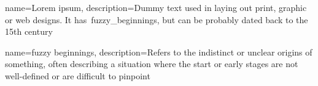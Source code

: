 
\makeglossaries

{
    name=Lorem ipsum,
    description={Dummy text used in laying out print, graphic or web designs.
    It has~\gls{fuzzy_beginnings}, but can be probably dated back to the 15th century}
}

{
    name=fuzzy beginnings,
    description={Refers to the indistinct or unclear origins of something,
    often describing a situation where the start or early stages are not well-defined or are difficult to pinpoint}
}


